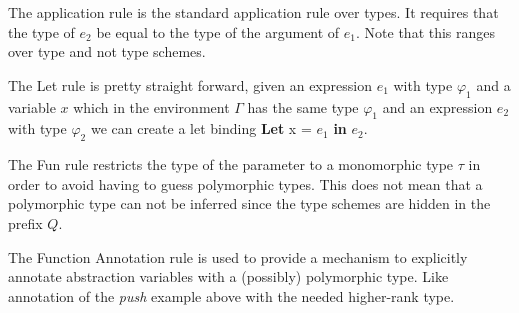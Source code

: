 \documentclass[twoside, titlepage, openright, a4paper]{book}
\begin{document}
\begin{prooftree}
\end{prooftree}

The application rule is the standard application rule over types. It requires that the type of $e_2$ be equal to the type of the argument of $e_1$. Note that this ranges over type and not type schemes.

\begin{prooftree}
\end{prooftree}

The Let rule is pretty straight forward, given an expression $e_1$ with type $\varphi_1$ and a variable $x$ which in the environment $\Gamma$ has the same type $\varphi_1$ and an expression $e_2$ with type $\varphi_2$ we can create a let binding \textbf{Let} x = $e_1$ \textbf{in} $e_2$.

\begin{prooftree}
\end{prooftree}

The Fun rule restricts the type of the parameter to a monomorphic type $\tau$ in order to avoid having to guess polymorphic types. This does not mean that a polymorphic type can not be inferred since the type schemes are hidden in the prefix $Q$.

\begin{prooftree}
\end{prooftree}

The Function Annotation rule is used to provide a mechanism to explicitly annotate abstraction variables with a (possibly) polymorphic type. Like annotation of the \textit{push} example above with the needed higher-rank type.
\end{document}
